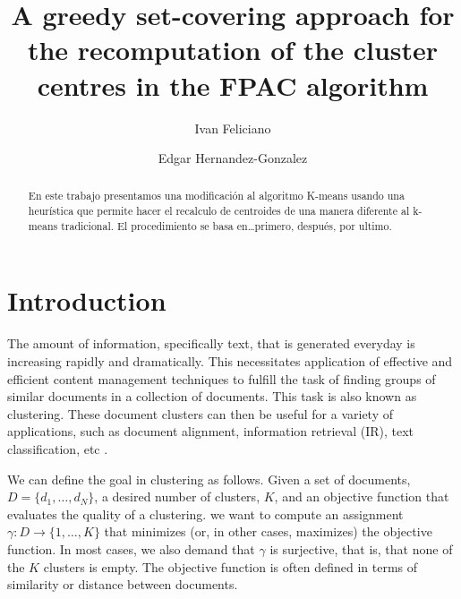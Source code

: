 \documentclass[runningheads]{llncs}
\begin{document}
%
\title{A greedy set-covering approach for the recomputation of the cluster centres in the FPAC algorithm}

\author{Ivan Feliciano \and
Edgar Hernandez-Gonzalez}
%
%
\maketitle              %
\begin{abstract}
En este trabajo presentamos una modificación al algoritmo K-means usando una heurística que permite hacer el recalculo de centroides de una manera diferente al k-means tradicional. El procedimiento se basa en…primero, después, por ultimo.

\end{abstract}
%
%
%
\section{Introduction}


The amount of information, specifically text, that is generated everyday
is increasing rapidly and dramatically. This necessitates application of effective and efficient content management techniques to fulfill the task of finding groups of similar documents in a collection of documents. This task is also known as 
clustering. These document clusters can then be useful for a variety
of applications, such as document alignment, information retrieval
(IR), text classification, etc \cite{ganguly_2018}.

We can define the goal in clustering as follows. 
Given a set of documents, $D = \{d_1 , \dots , d_N \}$,
a desired number of clusters, $K$,  and 
an objective function that evaluates the quality of a clustering.
we want to compute an assignment $\gamma : D \rightarrow \{1, \dots , K \}$ that minimizes (or, in other cases,
maximizes) the objective function. In most cases, we also demand that $\gamma$ is
surjective, that is, that none of the $K$ clusters is empty.
The objective function is often defined in terms of similarity or distance between documents.
\end{document}
